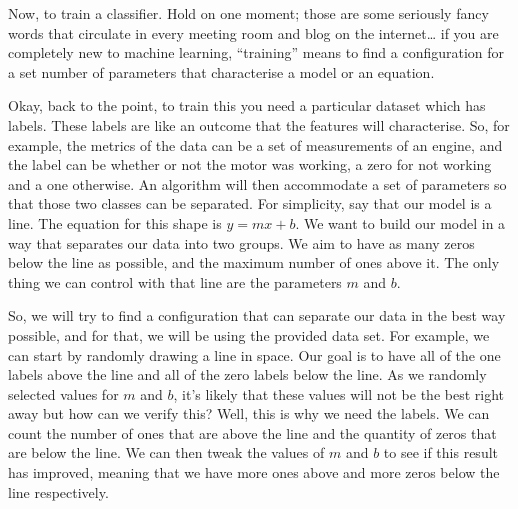 \documentclass[600paper, 11pt,twoside,openany]{kdp}
\begin{document}
\par 
\vspace{-3pt}
\indent Now, to train a classifier. Hold on one moment; those are some seriously fancy words that circulate in every meeting room and blog on the internet… if you are completely new to machine learning, “training” means to find a configuration for a set number of parameters that characterise a model or an equation. 
\par 
\vspace{-3pt}
\indent Okay, back to the point, to train this you need a particular dataset which has labels. These labels are like an outcome that the features will characterise. So, for example, the metrics of the data can be a set of measurements of an engine, and the label can be whether or not the motor was working, a zero for not working and a one otherwise. An algorithm will then accommodate a set of parameters so that those two classes can be separated. For simplicity, say that our model is a line. The equation for this shape is $y=mx+b$. We want to build our model in a way that separates our data into two groups. We aim to have as many zeros below the line as possible, and the maximum number of ones above it. The only thing we can control with that line are the parameters $m$ and $b$. 
\par 
\vspace{-3pt}
\indent So, we will try to find a configuration that can separate our data in the best way possible, and for that, we will be using the provided data set. For example, we can start by randomly drawing a line in space. Our goal is to have all of the one labels above the line and all of the zero labels below the line. As we randomly selected values for $m$ and $b$, it’s likely that these values will not be the best right away but how can we verify this? Well, this is why we need the labels. We can count the number of ones that are above the line and the quantity of zeros that are below the line. We can then tweak the values of $m$ and $b$ to see if this result has improved, meaning that we have more ones above and more zeros below the line respectively. 
\end{document}
